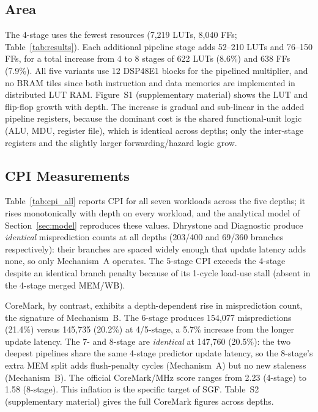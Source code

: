 \documentclass[acmsmall,nonacm,screen]{acmart}
\begin{document}
\subsection{Area}
\label{sec:area}

The 4-stage uses the fewest resources (7{,}219 LUTs, 8{,}040 FFs; Table~\ref{tab:results}).
Each additional pipeline stage adds 52--210 LUTs and 76--150 FFs, for a total increase from 4 to 8 stages of 622 LUTs (8.6\%) and 638 FFs (7.9\%).
All five variants use 12 DSP48E1 blocks for the pipelined multiplier, and no BRAM tiles since both instruction and data memories are implemented in distributed LUT RAM.
Figure~S1 (supplementary material) shows the LUT and flip-flop growth with depth. The increase is gradual and sub-linear in the added pipeline registers, because the dominant cost is the shared functional-unit logic (ALU, MDU, register file), which is identical across depths; only the inter-stage registers and the slightly larger forwarding/hazard logic grow.

\subsection{CPI Measurements}
\label{sec:cpi}

Table~\ref{tab:cpi_all} reports CPI for all seven workloads across the five depths; it rises monotonically with depth on every workload, and the analytical model of Section~\ref{sec:model} reproduces these values.
Dhrystone and Diagnostic produce \emph{identical} misprediction counts at all depths (203/400 and 69/360 branches respectively): their branches are spaced widely enough that update latency adds none, so only Mechanism~A operates.
The 5-stage CPI exceeds the 4-stage despite an identical branch penalty because of its 1-cycle load-use stall (absent in the 4-stage merged MEM/WB).

CoreMark, by contrast, exhibits a depth-dependent rise in misprediction count, the signature of Mechanism~B.
The 6-stage produces 154{,}077 mispredictions (21.4\%) versus 145{,}735 (20.2\%) at 4/5-stage, a 5.7\% increase from the longer update latency. The 7- and 8-stage are \emph{identical} at 147{,}760 (20.5\%): the two deepest pipelines share the same 4-stage predictor update latency, so the 8-stage's extra MEM split adds flush-penalty cycles (Mechanism~A) but no new staleness (Mechanism~B).
The official CoreMark/MHz score ranges from 2.23 (4-stage) to 1.58 (8-stage).
This inflation is the specific target of SGF.
Table~S2 (supplementary material) gives the full CoreMark figures across depths.
\end{document}
